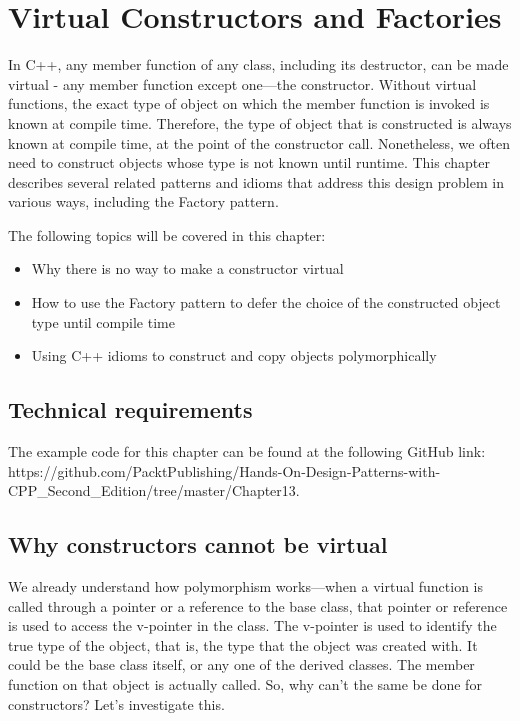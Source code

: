 ﻿\chapter{Virtual Constructors and Factories}

In C++, any member function of any class, including its destructor, can be made virtual - any member function except one---the constructor. Without virtual functions, the exact type of object on which the member function is invoked is known at compile time. Therefore, the type of object that is constructed is always known at compile time, at the point of the constructor call. Nonetheless, we often need to construct objects whose type is not known until runtime. This chapter describes several related patterns and idioms that address this design problem in various ways, including the Factory pattern.

The following topics will be covered in this chapter:

\begin{itemize}
\item
  Why there is no way to make a constructor virtual
\item
  How to use the Factory pattern to defer the choice of the constructed object type until compile time
\item
  Using C++ idioms to construct and copy objects polymorphically
\end{itemize}

\section{Technical requirements}

The example code for this chapter can be found at the following GitHub link: https://github.com/PacktPublishing/Hands-On-Design-Patterns-with-CPP\_Second\_Edition/tree/master/Chapter13.

\section{Why constructors cannot be virtual}

We already understand how polymorphism works---when a virtual function is called through a pointer or a reference to the base class, that pointer or reference is used to access the v-pointer in the class. The v-pointer is used to identify the true type of the object, that is, the type that the object was created with. It could be the base class itself, or any one of the derived classes. The member function on that object is actually called. So, why can't the same be done for constructors? Let's investigate this.

